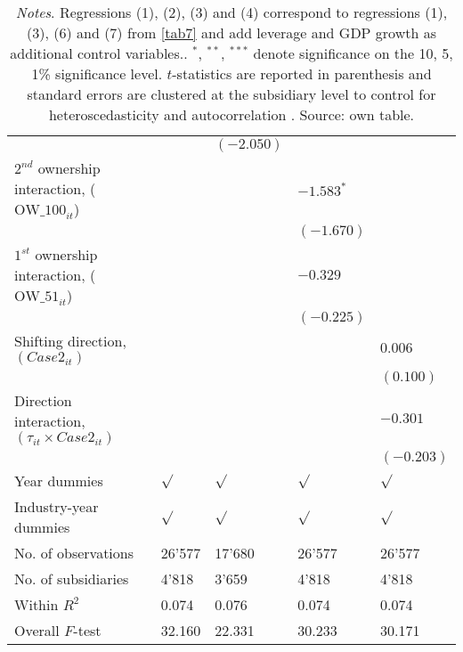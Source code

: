 \documentclass[10pt,twocolumn,oneside,cmyk]{article}
\begin{document}
\begin{table*}[t]
\begin{center}
\begin{tabularx}{0.85\textwidth}{l *{4}{Y}}
     & &$(-2.050)$\\
     $2^{nd}$ ownership interaction, ($\text{OW\_100}_{it}$) & & &$-1.583^*$\\
     & & &$(-1.670)$\\
     $1^{st}$ ownership interaction, ($\text{OW\_51}_{it}$) & & &$-0.329$\\
     & & &$(-0.225)$\\
     Shifting direction, $(Case2_{it})$ & & & &$0.006$\\
     & & & &$(0.100)$\\
     Direction interaction, $(\tau_{it}\times Case2_{it})$ & & & &$-0.301$\\
     & & & &$(-0.203)$\\
    Year dummies &$\sqrt{}$ &$\sqrt{}$ &$\sqrt{}$ &$\sqrt{}$\\
    Industry-year dummies &$\sqrt{}$ &$\sqrt{}$ &$\sqrt{}$ &$\sqrt{}$ \\
    No. of observations &26'577 &17'680 &26'577 &26'577\\
    No. of subsidiaries &4'818 &3'659 &4'818 &4'818\\
    Within $R^2$ &0.074 &0.076 &0.074 &0.074\\
    Overall $F$-test &32.160 &22.331 &30.233 &30.171\\
    \bottomrule
   \end{tabularx}
  \caption*{\footnotesize{\textit{Notes}. Regressions (1), (2), (3) and (4) correspond to regressions (1), (3), (6) and (7) from \cref{tab7} and add leverage and GDP growth as additional control variables.. $^*$, $^{**}$, $^{***}$ denote significance on the 10, 5, 1\% significance level. $t$-statistics are reported in parenthesis and standard errors are clustered at the subsidiary level to control for heteroscedasticity and autocorrelation \parencite[285]{hoechle_robust_2007}. Source: own table.}}
 \end{center}
\end{table*}
\end{document}
